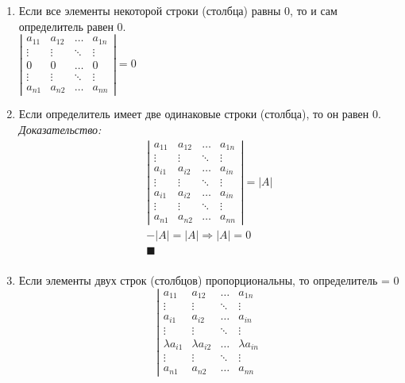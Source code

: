 \documentclass[12pt, fleqn]{article}
\begin{document}
\begin{enumerate}
	\item Если все элементы некоторой строки (столбца) равны 0, то и сам определитель равен 0.\\
	$ 
	\left|
	\begin{array}{cccc}
		a_{11} & a_{12} & \ldots & a_{1n}\\
		\vdots & \vdots & \ddots & \vdots\\
		0&0&\ldots&0\\
		\vdots & \vdots & \ddots & \vdots\\
		a_{n1} & a_{n2} & \ldots & a_{nn}
	\end{array}
	\right| =0$
	\item Если определитель имеет две одинаковые строки (столбца), то он равен 0.\\
	\textit{Доказательство:}
	\begin{multline*}
		\left|
	\begin{array}{cccc}
		a_{11} & a_{12} & \ldots & a_{1n}\\
		\vdots & \vdots & \ddots & \vdots\\
		 a_{i1} &  a_{i2} & \ldots & a_{in}\\
		\vdots & \vdots & \ddots & \vdots\\
		a_{i1} & a_{i2} & \ldots & a_{in}\\
		\vdots & \vdots & \ddots & \vdots\\
		a_{n1} & a_{n2} & \ldots & a_{nn}
	\end{array}
	\right| =\left|A\right|\\
	-\left|A\right| = \left|A\right| \Rightarrow \left|A\right| = 0\\
	\blacksquare\\
	\end{multline*}
	\item Если элементы двух строк (столбцов) пропорциональны, то определитель = 0
	\begin{equation*}
		\left|
		\begin{array}{cccc}
			a_{11} & a_{12} & \ldots & a_{1n}\\
			\vdots & \vdots & \ddots & \vdots\\
			a_{i1} & a_{i2} & \ldots & a_{in}\\
			\vdots & \vdots & \ddots & \vdots\\
			\lambda a_{i1} & \lambda a_{i2} & \ldots & \lambda a_{in}\\
			\vdots & \vdots & \ddots & \vdots\\
			a_{n1} & a_{n2} & \ldots & a_{nn}
		\end{array}

\end{equation*}
\end{enumerate}
\end{document}
